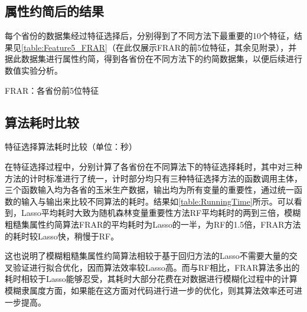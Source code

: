\subsection{属性约简后的结果}
每个省份的数据集经过特征选择后，分别得到了不同方法下最重要的10个特征，结果见\ref{table:Feature5_FRAR}（在此仅展示FRAR的前5位特征，其余见附录），并据此数据集进行属性约简，得到各省份在不同方法下的约简数据集，以便后续进行数值实验分析。
\begin{table}[htbp]
      \centering
      \caption{FRAR：各省份前5位特征}
      \label{table:Feature5_FRAR}
      \resizebox{\textwidth}{!}
      {
      }
\end{table}

\subsection{算法耗时比较}

\begin{table}[htbp]
      \centering
      \caption{特征选择算法耗时比较（单位：秒）}
      \label{table:RunningTime}
\end{table}

在特征选择过程中，分别计算了各省份在不同算法下的特征选择耗时，其中对三种方法的计时标准进行了统一，计时部分均只有三种特征选择方法的函数调用主体，三个函数输入均为各省的玉米生产数据，输出均为所有变量的重要性，通过统一函数的输入与输出来比较不同算法的耗时。结果如\ref{table:RunningTime}所示。可以看到，Lasso平均耗时大致为随机森林变量重要性方法RF平均耗时的两到三倍，模糊粗糙集属性约简算法FRAR的平均耗时为Lasso的一半，为RF的1.5倍，FRAR方法的耗时较Lasso快，稍慢于RF。

这也说明了模糊粗糙集属性约简算法相较于基于回归方法的Lasso不需要大量的交叉验证进行拟合优化，因而算法效率较Lasso高。而与RF相比，FRAR算法多出的耗时相较于Lasso能够忍受，其耗时大部分花费在对数据进行模糊化过程中的计算模糊隶属度方面，如果能在这方面对代码进行进一步的优化，则其算法效率还可进一步提高。






